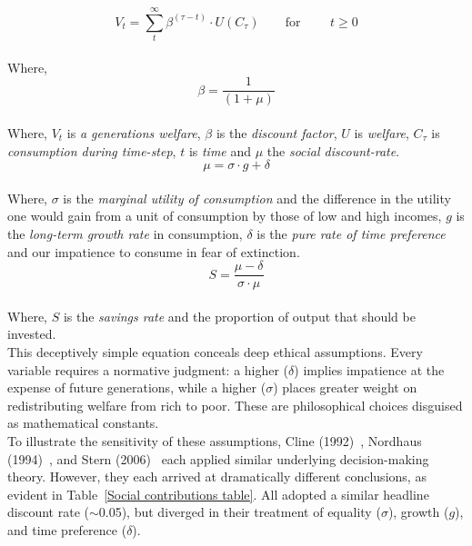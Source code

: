 \begin{equation}
V_t = \sum_t^\infty \beta^{(\tau - t)} \cdot U (C_\tau)
\qquad \text{for }
\qquad t \geq 0
\end{equation}\\

Where,
\begin{equation}
\beta = \frac{1}{(1+\mu)}
\end{equation}\\

Where, $V_t$ is \emph{a generations welfare}, $\beta$ is the \emph{discount factor}, $U$ is \emph{welfare}, $C_\tau$ is \emph{consumption during time-step}, $t$ is \emph{time} and $\mu$ the \emph{social discount-rate}.\\

\begin{equation}
\mu = \sigma \cdot g + \delta
\end{equation}\\

Where, $\sigma$ is the \emph{marginal utility of consumption} and the difference in the utility one would gain from a unit of consumption by those of low and high incomes, $g$ is the \emph{long-term growth rate} in consumption, $\delta$ is the \emph{pure rate of time preference} and our impatience to consume in fear of extinction.\\

\begin{equation}
S = \frac{\mu-\delta}{\sigma \cdot \mu}
\end{equation}\\

Where, $S$ is the \emph{savings rate} and the proportion of output that should be invested.\\

This deceptively simple equation conceals deep ethical assumptions.
Every variable requires a normative judgment: a higher ($\delta$) implies impatience at the expense of future generations, while a higher ($\sigma$) places greater weight on redistributing welfare from rich to poor.
These are philosophical choices disguised as mathematical constants.\\

To illustrate the sensitivity of these assumptions, Cline (1992)~\cite{wc1}, Nordhaus (1994)~\cite{wn1}, and Stern (2006)~\cite{ns1} each applied similar underlying decision-making theory.
However, they each arrived at dramatically different conclusions, as evident in Table~\ref{Social contributions table}.
All adopted a similar headline discount rate ($\sim$0.05), but diverged in their treatment of equality ($\sigma$), growth ($g$), and time preference ($\delta$).\\

